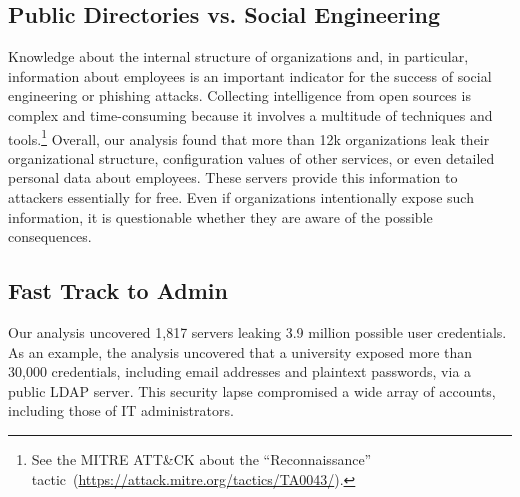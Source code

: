 
\subsection{Public Directories vs. Social Engineering}
Knowledge about the internal structure of organizations and, in particular, information about employees is an important indicator for the success of social engineering or phishing attacks. Collecting intelligence from open sources is complex and time-consuming because it involves a multitude of techniques and tools.\footnote{See the MITRE ATT\&CK about the ``Reconnaissance'' tactic~(\url{https://attack.mitre.org/tactics/TA0043/}).} Overall, our analysis found that more than 12k organizations leak their organizational structure, configuration values of other services, or even detailed personal data about employees. These servers provide this information to attackers essentially for free. Even if organizations intentionally expose such information, it is questionable whether they are aware of the possible consequences.

\subsection{Fast Track to Admin}
\label{sec:fastTrackToAdmin}
Our analysis uncovered 1,817 servers leaking 3.9 million possible user credentials. As an example, the analysis uncovered that a university exposed more than 30,000 credentials, including email addresses and plaintext passwords, via a public LDAP server. This security lapse compromised a wide array of accounts, including those of IT administrators. %

